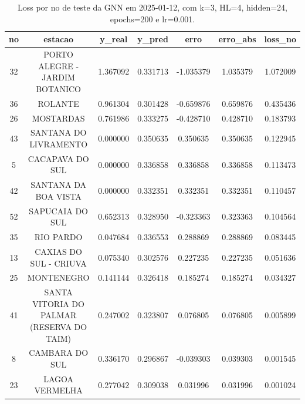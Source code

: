 \begin{table}[h]
\centering
\caption{Loss por no de teste da GNN em 2025-01-12, com k=3, HL=4, hidden=24, epochs=200 e lr=0.001.}
\label{tab:gnn_loss_k3_hl4_h24_e200_d20250112}
\begin{tabular}{ccccccc}
\toprule
no & estacao & y\_real & y\_pred & erro & erro\_abs & loss\_no \\
\midrule
32 & PORTO ALEGRE - JARDIM BOTANICO & 1.367092 & 0.331713 & -1.035379 & 1.035379 & 1.072009 \\
36 & ROLANTE & 0.961304 & 0.301428 & -0.659876 & 0.659876 & 0.435436 \\
26 & MOSTARDAS & 0.761986 & 0.333275 & -0.428710 & 0.428710 & 0.183793 \\
43 & SANTANA DO LIVRAMENTO & 0.000000 & 0.350635 & 0.350635 & 0.350635 & 0.122945 \\
5 & CACAPAVA DO SUL & 0.000000 & 0.336858 & 0.336858 & 0.336858 & 0.113473 \\
42 & SANTANA DA BOA VISTA & 0.000000 & 0.332351 & 0.332351 & 0.332351 & 0.110457 \\
52 & SAPUCAIA DO SUL & 0.652313 & 0.328950 & -0.323363 & 0.323363 & 0.104564 \\
35 & RIO PARDO & 0.047684 & 0.336553 & 0.288869 & 0.288869 & 0.083445 \\
13 & CAXIAS DO SUL - CRIUVA & 0.075340 & 0.302576 & 0.227235 & 0.227235 & 0.051636 \\
25 & MONTENEGRO & 0.141144 & 0.326418 & 0.185274 & 0.185274 & 0.034327 \\
41 & SANTA VITORIA DO PALMAR (RESERVA DO TAIM) & 0.247002 & 0.323807 & 0.076805 & 0.076805 & 0.005899 \\
8 & CAMBARA DO SUL & 0.336170 & 0.296867 & -0.039303 & 0.039303 & 0.001545 \\
23 & LAGOA VERMELHA & 0.277042 & 0.309038 & 0.031996 & 0.031996 & 0.001024 \\
\bottomrule
\end{tabular}
\end{table}
